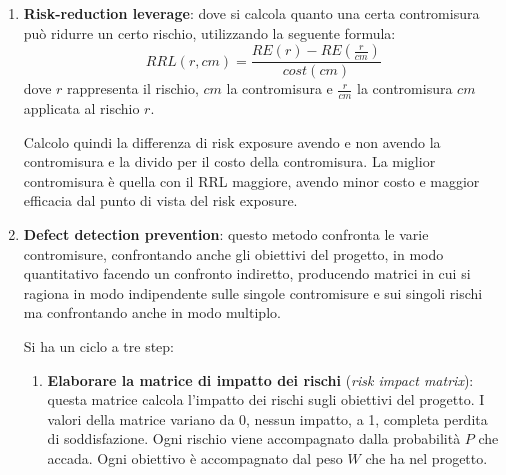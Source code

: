 \begin{enumerate}
    \item \textbf{Risk-reduction leverage}: dove si calcola quanto una certa
          contromisura può ridurre un certo rischio, utilizzando la seguente formula:
          \begin{equation}
              RRL(r, cm) = \frac{RE(r) - RE(\frac{r}{cm})}{cost(cm)}
          \end{equation}
          dove $r$ rappresenta il rischio, $cm$ la contromisura e $\frac{r}{cm}$ la
          contromisura $cm$ applicata al rischio $r$.

          Calcolo quindi la differenza di risk exposure avendo e non avendo la contromisura
          e la divido per il costo della contromisura. La miglior contromisura è quella
          con il RRL maggiore, avendo minor costo e maggior efficacia dal punto di vista
          del risk exposure.
    \item \textbf{Defect detection prevention}: questo metodo confronta le varie
          contromisure, confrontando anche gli obiettivi del progetto, in modo
          quantitativo facendo un confronto indiretto, producendo matrici in cui
          si ragiona in modo indipendente sulle singole contromisure e sui singoli
          rischi ma confrontando anche in modo multiplo.

          Si ha un ciclo a tre step:
          \begin{enumerate}
              \item \textbf{Elaborare la matrice di impatto dei rischi} (\textit{risk
                        impact matrix}): questa matrice calcola l'impatto dei
                    rischi sugli obiettivi del progetto. I valori della matrice
                    variano da 0, nessun impatto, a 1, completa perdita di
                    soddisfazione. Ogni rischio viene accompagnato dalla
                    probabilità $P$ che accada. Ogni obiettivo è accompagnato
                    dal peso $W$ che ha nel progetto.


\end{enumerate}
\end{enumerate}
